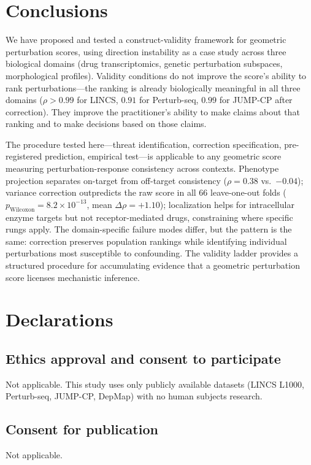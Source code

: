 \documentclass[11pt]{article}
\begin{document}
\section{Conclusions}

We have proposed and tested a construct-validity framework for geometric
perturbation scores, using direction instability as a case study across
three biological domains (drug transcriptomics, genetic perturbation
subspaces, morphological profiles). Validity conditions do not improve the
score's ability to rank perturbations---the ranking is already biologically
meaningful in all three domains ($\rho > 0.99$ for LINCS, $0.91$ for
Perturb-seq, $0.99$ for JUMP-CP after correction). They improve the
practitioner's ability to make claims about that ranking and to make
decisions based on those claims.

The procedure tested here---threat identification, correction
specification, pre-registered prediction, empirical test---is applicable
to any geometric score measuring perturbation-response consistency across
contexts. Phenotype projection separates on-target from off-target
consistency ($\rho = 0.38$ vs.\ $-0.04$); variance correction
outpredicts the raw score in all 66 leave-one-out folds
($p_{\text{Wilcoxon}} = 8.2 \times 10^{-13}$, mean
$\Delta\rho = +1.10$); localization helps for intracellular enzyme
targets but not receptor-mediated drugs, constraining where specific
rungs apply. The domain-specific failure modes differ, but the pattern
is the same: correction preserves population rankings while identifying
individual perturbations most susceptible to confounding. The validity
ladder provides a structured procedure for accumulating evidence that
a geometric perturbation score licenses mechanistic inference.

\section*{Declarations}

\subsection*{Ethics approval and consent to participate}
Not applicable. This study uses only publicly available datasets
(LINCS L1000, Perturb-seq, JUMP-CP, DepMap) with no human subjects
research.

\subsection*{Consent for publication}
Not applicable.
\end{document}
